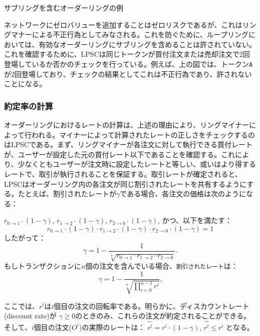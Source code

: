 \documentclass{article}
\makeatletter
\newenvironment{figurehere}
 {\def\@captype{figure}}
 {}
\makeatother
\begin{document}
\begin{multicols}{2}
\begin{center}
\begin{figurehere}
\begin{tikzpicture}
\end{tikzpicture}

\caption{サブリングを含むオーダーリングの例}
\label{fig:subring}
\end{figurehere}
\end{center}

ネットワークにゼロバリューを追加することはゼロリスクであるが、これはリングマナーによる不正行為としてみなされる。これを防ぐために、ループリングにおいては、有効なオーダーリングにサブリングを含めることは許されていない。これを確認するために、LPSCは同じトークンが買付注文または売却注文で2回登場しているか否かのチェックを行っている。例えば、上の図では、トークン\verb|A| が2回登場しており、チェックの結果としてこれは不正行為であり、許されないことになる。

\subsubsection{約定率の計算\label{sec:fill_rate_check}}

オーダーリングにおけるレートの計算は、上述の理由により、リングマイナーによって行われる。マイナーによって計算されたレートの正しさをチェックするのはLPSCである。まず、リングマイナーが各注文に対して執行できる買付レートが、ユーザーが設定した元の買付レート以下であることを確認する。これにより、少なくともユーザーが注文時に設定したレートと等しい、或いはより得するレートで、取引が執行されることを保証する。取引レートが確定されると、LPSCはオーダーリング内の各注文が同じ割引されたレートを共有するようにする。たとえば、割引されたレートが$\gamma$である場合、各注文の価格は次のようになる：

$r_{0\rightarrow 1} \cdot (1-\gamma)$, $r_{1\rightarrow 2} \cdot (1-\gamma)$, $r_{2 \rightarrow 0} \cdot (1-\gamma)$, かつ、以下を満たす： 
\begin{equation}
r_{0\rightarrow 1} \cdot (1-\gamma)\cdot r_{1\rightarrow 2} \cdot (1-\gamma) \cdot r_{2 \rightarrow 0} \cdot (1-\gamma) = 1
\end{equation}
したがって： 
\begin{equation}
\gamma = 1- \frac{1}{\sqrt[3]{r_{0\rightarrow 1} \cdot r_{1\rightarrow 2} \cdot r_{2\rightarrow 0}}}\text{.}
\end{equation}
もしトランザクションに$n$個の注文を含んでいる場合、\texttt{割引されたレート}は：
\begin{equation}
\gamma = 1- \frac{1}{\sqrt[n]{\prod_{i=0}^{n-1} r^i}} \text{,}
\end{equation}

ここでは、$r^i$は$i$個目の注文の回転率である。明らかに、ディスカウントレート(discount rate)が $\gamma \ge 0$のときのみ、これらの注文が約定されることができる。そして、$i$個目の注文($O^i$)の実際のレートは： $\hat{r^i} = r^i \cdot (1-\gamma)$, $\hat{r^i}\le r^i$ となる。


\end{multicols}
\end{document}
